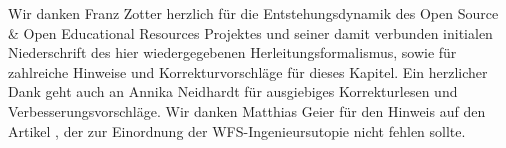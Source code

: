 Wir danken Franz Zotter herzlich für die Entstehungsdynamik des
Open Source \& Open Educational Resources Projektes \cite{ZotterSchultz2020_White} und seiner
damit verbunden initialen Niederschrift des hier wiedergegebenen
Herleitungsformalismus, sowie für zahlreiche Hinweise und Korrekturvorschläge
für dieses Kapitel.
%
Ein herzlicher Dank geht auch an Annika Neidhardt für ausgiebiges Korrekturlesen und
Verbesserungsvorschläge.
%
Wir danken Matthias Geier für den Hinweis auf den Artikel \cite{Fletcher1934},
der zur Einordnung der WFS-Ingenieursutopie nicht fehlen sollte.
